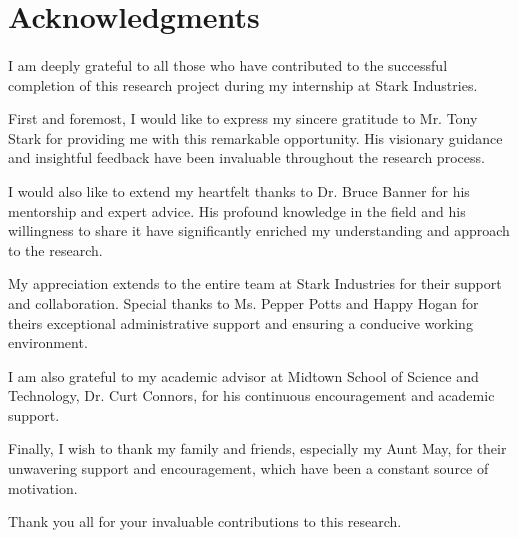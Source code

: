\section*{Acknowledgments}
\paragraph{}

I am deeply grateful to all those who have contributed to the successful completion of this research project during my internship at Stark Industries.

First and foremost, I would like to express my sincere gratitude to Mr. Tony Stark for providing me with this remarkable opportunity. His visionary guidance and insightful feedback have been invaluable throughout the research process.

I would also like to extend my heartfelt thanks to Dr. Bruce Banner for his mentorship and expert advice. His profound knowledge in the field and his willingness to share it have significantly enriched my understanding and approach to the research.

My appreciation extends to the entire team at Stark Industries for their support and collaboration. Special thanks to Ms. Pepper Potts and Happy Hogan for theirs exceptional administrative support and ensuring a conducive working environment.

I am also grateful to my academic advisor at Midtown School of Science and Technology, Dr. Curt Connors, for his continuous encouragement and academic support.

Finally, I wish to thank my family and friends, especially my Aunt May, for their unwavering support and encouragement, which have been a constant source of motivation.

Thank you all for your invaluable contributions to this research.
